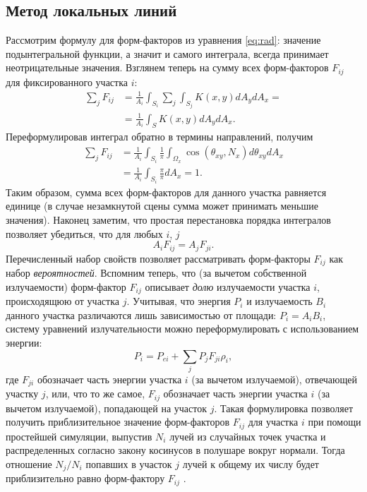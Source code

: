 \documentclass[12pt]{article}
\begin{document}
\subsection{Метод локальных линий}
Рассмотрим формулу для форм-факторов из уравнения \eqref{eq:rad}: значение подынтегральной функции, а значит и самого интеграла, всегда принимает неотрицательные значения. Взглянем теперь на сумму всех форм-факторов $F_{ij}$ для фиксированного участка $i$:
\begin{equation}
\begin{split}
\sum_j F_{ij} &= \frac{1}{A_i} \int_{S_i} \sum_j \int_{S_j} K(x,y) dA_y dA_x = \\
&= \frac{1}{A_i} \int_S K(x,y) dA_y dA_x.
\label{eq:ff-sum}
\end{split}
\end{equation}
Переформулировав интеграл обратно в термины направлений, получим
\begin{equation}
\begin{split}
\sum_j F_{ij} &= \frac{1}{A_i} \int_{S_i} \frac{1}{\pi} \int_{\Omega_x} \cos(\theta_{xy}, N_x) d\theta_{xy} dA_x\\
&= \frac{1}{A_i} \int_{S_i} \frac{\pi}{\pi} dA_x= 1.
\label{eq:ff-sum2}
\end{split}
\end{equation}
Таким образом, сумма всех форм-факторов для данного участка равняется единице (в случае незамкнутой сцены сумма может принимать меньшие значения). Наконец заметим, что простая перестановка порядка интегралов позволяет убедиться, что для любых $i$, $j$
\begin{equation}
A_i F_{ij} = A_j F_{ji}.\label{eq:ff-rep}
\end{equation}
Перечисленный набор свойств позволяет рассматривать форм-факторы $F_{ij}$ как набор \emph{вероятностей}. Вспомним теперь, что (за вычетом собственной излучаемости) форм-фактор $F_{ij}$ описывает \emph{долю} излучаемости участка $i$, происходящюю от участка $j$. Учитывая, что энергия $P_i$ и излучаемость $B_i$ данного участка различаются лишь зависимостью от площади: $P_i = A_i B_i$, систему уравнений излучательности можно переформулировать с использованием энергии:
\begin{equation}
P_i = P_{ei} + \sum_j P_j F_{ji} \rho_i, \label{eq:rad-pow}
\end{equation}
где $F_{ji}$ обозначает часть энергии участка $i$ (за вычетом излучаемой), отвечающей участку $j$, или, что то же самое, $F_{ij}$ обозначает часть энергии участка $i$ (за вычетом излучаемой), попадающей на участок $j$. Такая формулировка позволяет получить приблизительное значение форм-факторов $F_{ij}$ для участка $i$ при помощи простейшей симуляции, выпустив $N_i$ лучей из случайных точек участка и распределенных согласно закону косинусов в полушаре вокруг нормали. Тогда отношение $N_j / N_i$ попавших в участок $j$ лучей к общему их числу будет приблизительно равно форм-фактору $F_{ij}$ \cite{Shir90}.
\end{document}
